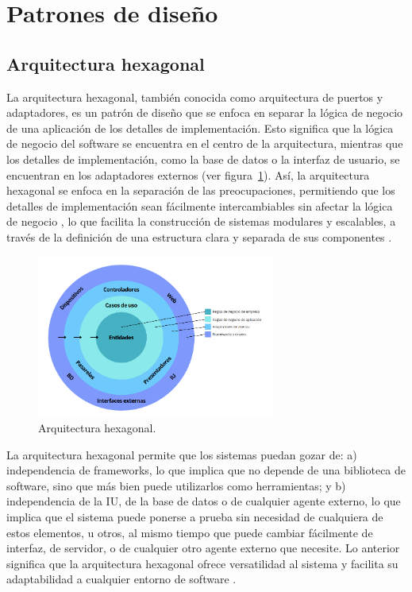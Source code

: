 \section{Patrones de diseño}
\subsection{Arquitectura hexagonal}
La arquitectura hexagonal, también conocida como arquitectura de puertos y adaptadores, es un patrón de diseño que se enfoca en separar la lógica de negocio de una aplicación de los detalles de implementación. Esto significa que la lógica de negocio del software se encuentra en el centro de la arquitectura, mientras que los detalles de implementación, como la base de datos o la interfaz de usuario, se encuentran en los adaptadores externos (ver figura~\ref{Img:Arquitectura+Hexagonal}). Así, la arquitectura hexagonal se enfoca en la separación de las preocupaciones, permitiendo que los detalles de implementación sean fácilmente intercambiables sin afectar la lógica de negocio \cite{book:growing_object_oriented}, lo que facilita la construcción de sistemas modulares y escalables, a través de la definición de una estructura clara y separada de sus componentes \cite{art:arquitectura_basada_dominio}.

\begin{figure}[h]
    \centering
    \includegraphics[width=0.7\textwidth]{img/manual/arquitectura_hexagonal.png}
    \caption{Arquitectura hexagonal.} \label{Img:Arquitectura+Hexagonal}
\end{figure} 

La arquitectura hexagonal permite que los sistemas puedan gozar de: a) independencia de frameworks, lo que implica que no depende de una biblioteca de software, sino que más bien puede utilizarlos como herramientas; y b) independencia de la IU, de la base de datos o de cualquier agente externo, lo que implica que el sistema puede ponerse a prueba sin necesidad de cualquiera de estos elementos, u otros, al mismo tiempo que puede cambiar fácilmente de interfaz, de servidor, o de cualquier otro agente externo que necesite. Lo anterior significa que la arquitectura hexagonal ofrece versatilidad al sistema y facilita su adaptabilidad a cualquier entorno de software \cite{book:arquitectura_limpia}. 


